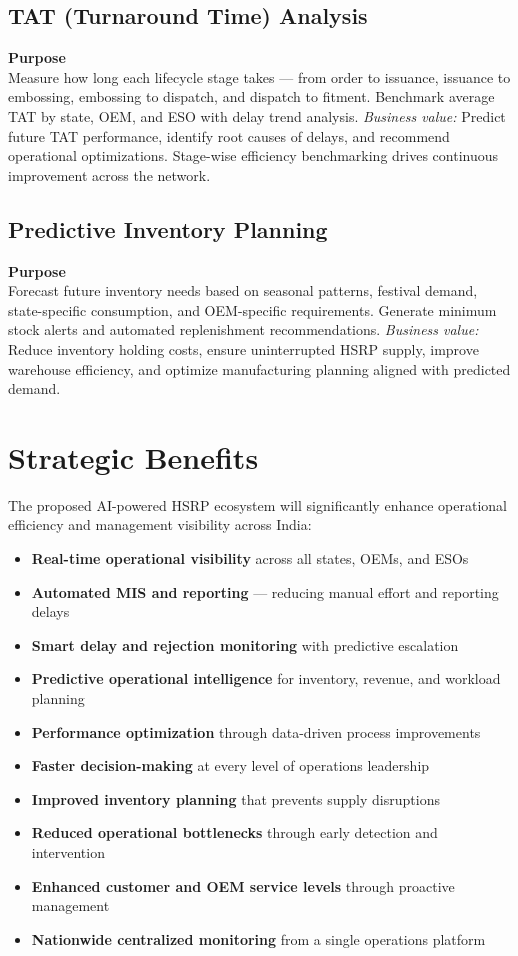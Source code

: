 \documentclass[11pt,a4paper]{article}
\newcommand{\capblock}[3]{%
    \vspace{0.25em}
    \noindent\textbf{#1}\\[0.15em]
    #2
    \vspace{0.2em}
    \noindent\textit{Business value:} #3
    \vspace{0.35em}
}
\begin{document}
\subsection{TAT (Turnaround Time) Analysis}

\capblock{Purpose}{%
Measure how long each lifecycle stage takes --- from order to issuance, issuance to embossing, embossing to dispatch, and dispatch to fitment. Benchmark average TAT by state, OEM, and ESO with delay trend analysis.}{%
Predict future TAT performance, identify root causes of delays, and recommend operational optimizations. Stage-wise efficiency benchmarking drives continuous improvement across the network.}

\subsection{Predictive Inventory Planning}

\capblock{Purpose}{%
Forecast future inventory needs based on seasonal patterns, festival demand, state-specific consumption, and OEM-specific requirements. Generate minimum stock alerts and automated replenishment recommendations.}{%
Reduce inventory holding costs, ensure uninterrupted HSRP supply, improve warehouse efficiency, and optimize manufacturing planning aligned with predicted demand.}

\section{Strategic Benefits}

The proposed AI-powered HSRP ecosystem will significantly enhance operational efficiency and management visibility across India:

\begin{itemize}[leftmargin=1.5em, itemsep=0.35em]
    \item \textbf{Real-time operational visibility} across all states, OEMs, and ESOs
    \item \textbf{Automated MIS and reporting} --- reducing manual effort and reporting delays
    \item \textbf{Smart delay and rejection monitoring} with predictive escalation
    \item \textbf{Predictive operational intelligence} for inventory, revenue, and workload planning
    \item \textbf{Performance optimization} through data-driven process improvements
    \item \textbf{Faster decision-making} at every level of operations leadership
    \item \textbf{Improved inventory planning} that prevents supply disruptions
    \item \textbf{Reduced operational bottlenecks} through early detection and intervention
    \item \textbf{Enhanced customer and OEM service levels} through proactive management
    \item \textbf{Nationwide centralized monitoring} from a single operations platform
\end{itemize}
\end{document}
